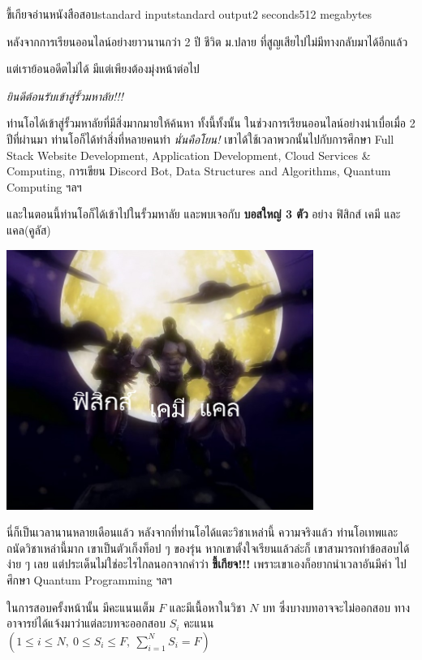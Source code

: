 \documentclass[11pt,a4paper]{article}
\begin{document}
\begin{problem}{ขี้เกียจอ่านหนังสือสอบ}{standard input}{standard output}{2 seconds}{512 megabytes}

หลังจากการเรียนออนไลน์อย่างยาวนานกว่า 2 ปี ชีวิต ม.ปลาย ที่สูญเสียไปไม่มีทางกลับมาได้อีกแล้ว

แต่เราย้อนอดีตไม่ได้ มีแต่เพียงต้องมุ่งหน้าต่อไป

\textit{ยินดีต้อนรับเข้าสู่รั้วมหาลัย!!!}

ท่านโอได้เข้าสู่รั้วมหาลัยที่มีสิ่งมากมายให้ค้นหา ทั้งนี้ทั้งนั้น
ในช่วงการเรียนออนไลน์อย่างน่าเบื่อเมื่อ 2 ปีที่ผ่านมา ท่านโอก็ได้ทำสิ่งที่หลายคนทำ \textit{นั่นคือโยน!}
เขาได้ใช้เวลาพวกนั้นไปกับการศึกษา Full Stack Website Development, Application Development,
Cloud Services \& Computing, การเขียน Discord Bot, Data Structures and Algorithms,
Quantum Computing ฯลฯ

และในตอนนี้ท่านโอก็ได้เข้าไปในรั้วมหาลัย และพบเจอกับ \textbf{บอสใหญ่ 3 ตัว} อย่าง ฟิสิกส์ เคมี และ แคล(คูลัส)

\begin{center}
\includegraphics[width=10cm]{./res/lazystudy/big3subj.jpg}
\end{center}

นี่ก็เป็นเวลานานหลายเดือนแล้ว หลังจากที่ท่านโอได้แตะวิชาเหล่านี้
ความจริงแล้ว ท่านโอเทพและถนัดวิชาเหล่านี้มาก เขาเป็นตัวเก็งท็อป ๆ ของรุ่น
หากเขาตั้งใจเรียนแล้วล่ะก็ เขาสามารถทำข้อสอบได้ง่าย ๆ เลย
แต่ประเด็นไม่ใช่อะไรไกลนอกจากคำว่า \textbf{ขี้เกียจ!!!} เพราะเขาเองก็อยากนำเวลาอันมีค่า
ไปศึกษา Quantum Programming ฯลฯ

ในการสอบครั้งหน้านั้น มีคะแนนเต็ม $F$ และมีเนื้อหาในวิชา $N$ บท ซึ่งบางบทอาจจะไม่ออกสอบ
ทางอาจารย์ได้แจ้งมาว่าแต่ละบทจะออกสอบ $S_i$ คะแนน
$(1 \le i \le N,\ 0 \le S_i \le F,\ \sum_{i=1}^{N} S_i = F)$


\end{problem}
\end{document}
